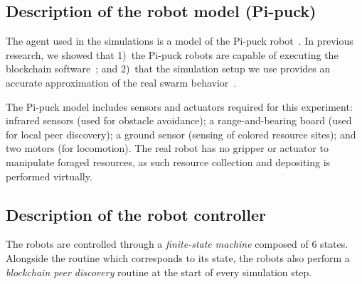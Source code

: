 \documentclass[runningheads]{llncs}
\newcommand{\rab}{range-and-bearing\xspace}
\begin{document}
\subsection{Description of the robot model (Pi-puck)}
The agent used in the simulations is a model of the Pi-puck robot~\cite{millard_2017_iros_pipuck}. In previous research, we showed that 1)~the Pi-puck robots are capable of executing the blockchain software~\cite{pacheco_ants_2020}; and 2)~that the simulation setup we use provides an accurate approximation of the real swarm behavior~\cite{StrCasDor2018:aamas}. 

The Pi-puck model includes sensors and actuators required for this experiment: infrared sensors (used for obstacle avoidance); a \rab board (used for local peer discovery); a ground sensor (sensing of colored resource sites); and two motors (for locomotion). The real robot has no gripper or actuator to manipulate foraged resources, as such resource collection and depositing is performed virtually.
 
\subsection{Description of the robot controller}
The robots are controlled through a \emph{finite-state machine} composed of 6 states. Alongside the routine which corresponds to its state, the robots also perform a \emph{blockchain peer discovery} routine at the start of every simulation step.

\vspace{-5mm}
\end{document}
